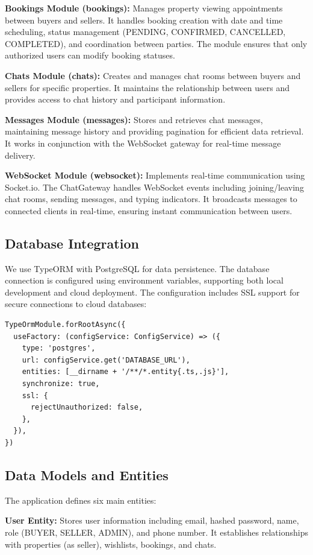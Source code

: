 \textbf{Bookings Module (bookings):} Manages property viewing appointments between buyers and sellers. It handles booking creation with date and time scheduling, status management (PENDING, CONFIRMED, CANCELLED, COMPLETED), and coordination between parties. The module ensures that only authorized users can modify booking statuses.

\textbf{Chats Module (chats):} Creates and manages chat rooms between buyers and sellers for specific properties. It maintains the relationship between users and provides access to chat history and participant information.

\textbf{Messages Module (messages):} Stores and retrieves chat messages, maintaining message history and providing pagination for efficient data retrieval. It works in conjunction with the WebSocket gateway for real-time message delivery.

\textbf{WebSocket Module (websocket):} Implements real-time communication using Socket.io. The ChatGateway handles WebSocket events including joining/leaving chat rooms, sending messages, and typing indicators. It broadcasts messages to connected clients in real-time, ensuring instant communication between users.

\subsection{Database Integration}

We use TypeORM with PostgreSQL for data persistence. The database connection is configured using environment variables, supporting both local development and cloud deployment. The configuration includes SSL support for secure connections to cloud databases:

\begin{verbatim}
TypeOrmModule.forRootAsync({
  useFactory: (configService: ConfigService) => ({
    type: 'postgres',
    url: configService.get('DATABASE_URL'),
    entities: [__dirname + '/**/*.entity{.ts,.js}'],
    synchronize: true,
    ssl: {
      rejectUnauthorized: false,
    },
  }),
})
\end{verbatim}

\subsection{Data Models and Entities}

The application defines six main entities:

\textbf{User Entity:} Stores user information including email, hashed password, name, role (BUYER, SELLER, ADMIN), and phone number. It establishes relationships with properties (as seller), wishlists, bookings, and chats.

